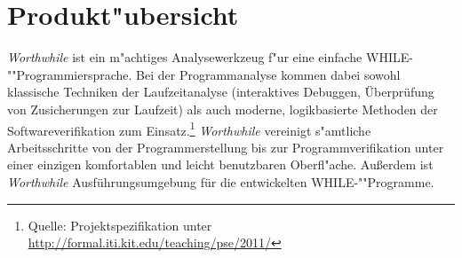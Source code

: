 \section{Produkt"ubersicht}%

\textit{Worthwhile} ist ein m"achtiges Analysewerkzeug f"ur eine einfache WHILE-""Programmiersprache. Bei der Programmanalyse kommen dabei sowohl klassische Techniken der Laufzeitanalyse (interaktives Debuggen, Überprüfung von Zusicherungen zur Laufzeit) als auch moderne, logikbasierte Methoden der Softwareverifikation zum Einsatz.\footnote{Quelle: Projektspezifikation unter \url{http://formal.iti.kit.edu/teaching/pse/2011/}} \textit{Worthwhile} vereinigt s"amtliche Arbeitsschritte von der Programmerstellung bis zur Programmverifikation unter einer einzigen komfortablen und leicht benutzbaren Oberfl"ache. Außerdem ist \textit{Worthwhile} Ausführungsumgebung für die entwickelten WHILE-""Programme.%
